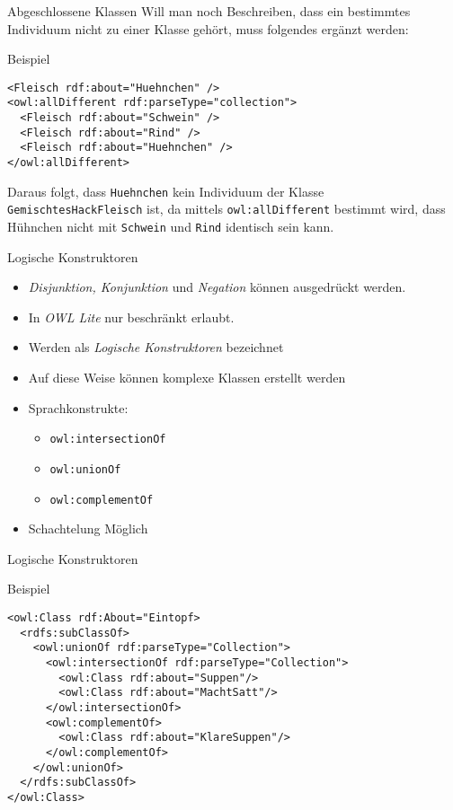\documentclass{beamer}
\begin{document}
\begin{frame}[fragile]{Abgeschlossene Klassen}
Will man noch Beschreiben, dass ein bestimmtes Individuum nicht zu einer Klasse
gehört, muss folgendes ergänzt werden:	
\begin{block}{Beispiel}
\begin{lstlisting}[lang="xml"]
<Fleisch rdf:about="Huehnchen" />
<owl:allDifferent rdf:parseType="collection">
  <Fleisch rdf:about="Schwein" />
  <Fleisch rdf:about="Rind" />
  <Fleisch rdf:about="Huehnchen" />
</owl:allDifferent>
\end{lstlisting}
\end{block}
Daraus folgt, dass \texttt{Huehnchen} \alert{kein} Individuum der Klasse 
\texttt{GemischtesHackFleisch} ist,
da mittels \texttt{owl:allDifferent} bestimmt wird, dass Hühnchen \alert{nicht} mit \texttt {Schwein}
und \texttt{Rind} identisch sein kann.
\end{frame}
%
\begin{frame}[fragile]{Logische Konstruktoren}
\begin{itemize}
\item \emph{Disjunktion, Konjunktion} und \emph{Negation} können
ausgedrückt werden.
\item In \emph{OWL Lite} nur beschränkt erlaubt.
\item Werden als \emph{Logische Konstruktoren} bezeichnet
\item Auf diese Weise können komplexe Klassen erstellt werden
\item Sprachkonstrukte:
\begin{itemize}
\item \texttt{owl:intersectionOf}
\item \texttt{owl:unionOf}
\item \texttt{owl:complementOf}
\end{itemize}
\item Schachtelung Möglich
\end{itemize}
\end{frame}
%
\begin{frame}[fragile]{Logische Konstruktoren}
\begin{exampleblock}{Beispiel}
\begin{lstlisting}[lang="xml"]
<owl:Class rdf:About="Eintopf>
  <rdfs:subClassOf>
    <owl:unionOf rdf:parseType="Collection">
      <owl:intersectionOf rdf:parseType="Collection">
        <owl:Class rdf:about="Suppen"/>
        <owl:Class rdf:about="MachtSatt"/>
      </owl:intersectionOf>
      <owl:complementOf>
        <owl:Class rdf:about="KlareSuppen"/>
      </owl:complementOf>
    </owl:unionOf>
  </rdfs:subClassOf>
</owl:Class>
\end{lstlisting}
\end{exampleblock}

\end{frame}
%
\end{document}

